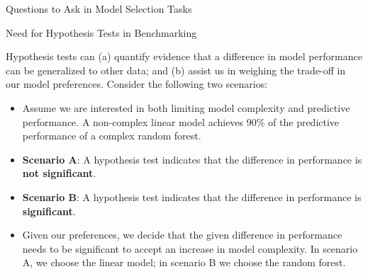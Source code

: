 \documentclass[11pt,compress,t,notes=noshow, aspectratio=169, xcolor=table]{beamer}
\begin{document}
\begin{frame}{Questions to Ask in Model Selection Tasks}

\end{frame}

\begin{frame}{Need for Hypothesis Tests in Benchmarking}

Hypothesis tests can (a) quantify evidence that a difference in model performance can be generalized to other data; and (b) assist us in weighing the trade-off in our model preferences. Consider the following two scenarios:
\vspace{0.25cm}
\begin{itemize}
    \setlength\itemsep{1em} 
    \item Assume we are interested in both limiting model complexity and predictive performance. A non-complex linear model achieves 90\% of the predictive performance of a complex random forest.
    \item \textbf{Scenario A}: A hypothesis test indicates that the difference in performance is \textbf{not significant}.
    \item \textbf{Scenario B}: A hypothesis test indicates that the difference in performance is \textbf{significant}.
    \item Given our preferences, we decide that the given difference in performance needs to be significant to accept an increase in model complexity. In scenario A, we choose the linear model; in scenario B we choose the random forest.
\end{itemize}


\end{frame}
\end{document}
